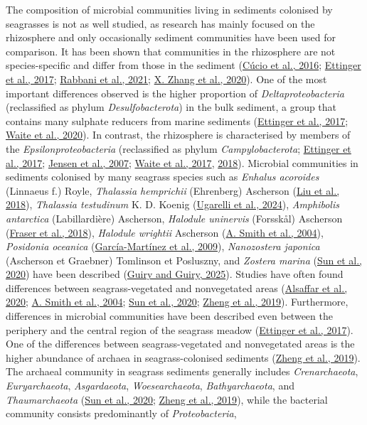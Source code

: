 \documentclass[
  12 pt,
]{book}
\begin{document}
The composition of microbial communities living in sediments colonised by seagrasses is not as well studied, as research has mainly focused on the rhizosphere and only occasionally sediment communities have been used for comparison. It has been shown that communities in the rhizosphere are not species-specific and differ from those in the sediment (\protect\hyperlink{ref-Cucio2016}{Cúcio et al., 2016}; \protect\hyperlink{ref-Ettinger2017}{Ettinger et al., 2017}; \protect\hyperlink{ref-Rabbani2021}{Rabbani et al., 2021}; \protect\hyperlink{ref-Zhang2020}{X. Zhang et al., 2020}). One of the most important differences observed is the higher proportion of \emph{Deltaproteobacteria} (reclassified as phylum \emph{Desulfobacterota}) in the bulk sediment, a group that contains many sulphate reducers from marine sediments (\protect\hyperlink{ref-Ettinger2017}{Ettinger et al., 2017}; \protect\hyperlink{ref-Waite2020}{Waite et al., 2020}). In contrast, the rhizosphere is characterised by members of the \emph{Epsilonproteobacteria} (reclassified as phylum \emph{Campylobacterota}; \protect\hyperlink{ref-Ettinger2017}{Ettinger et al., 2017}; \protect\hyperlink{ref-Jensen2007}{Jensen et al., 2007}; \protect\hyperlink{ref-Waite2017}{Waite et al., 2017}, \protect\hyperlink{ref-Waite2018}{2018}). Microbial communities in sediments colonised by many seagrass species such as \emph{Enhalus acoroides} (Linnaeus f.) Royle, \emph{Thalassia hemprichii} (Ehrenberg) Ascherson (\protect\hyperlink{ref-Liu2018}{Liu et al., 2018}), \emph{Thalassia testudinum} K. D. Koenig (\protect\hyperlink{ref-Ugarelli2024}{Ugarelli et al., 2024}), \emph{Amphibolis antarctica} (Labillardière) Ascherson, \emph{Halodule uninervis} (Forsskål) Ascherson (\protect\hyperlink{ref-Fraser2018}{Fraser et al., 2018}), \emph{Halodule wrightii} Ascherson (\protect\hyperlink{ref-Smith2004}{A. Smith et al., 2004}), \emph{Posidonia oceanica} (\protect\hyperlink{ref-Garcia-Martinez2009}{García-Martínez et al., 2009}), \emph{Nanozostera japonica} (Ascherson et Graebner) Tomlinson et Posluszny, and \emph{Zostera marina} (\protect\hyperlink{ref-Sun2020}{Sun et al., 2020}) have been described (\protect\hyperlink{ref-Guiry2025}{Guiry and Guiry, 2025}). Studies have often found differences between seagrass-vegetated and nonvegetated areas (\protect\hyperlink{ref-Alsaffar2020}{Alsaffar et al., 2020}; \protect\hyperlink{ref-Smith2004}{A. Smith et al., 2004}; \protect\hyperlink{ref-Sun2020}{Sun et al., 2020}; \protect\hyperlink{ref-Zheng2019}{Zheng et al., 2019}). Furthermore, differences in microbial communities have been described even between the periphery and the central region of the seagrass meadow (\protect\hyperlink{ref-Ettinger2017}{Ettinger et al., 2017}). One of the differences between seagrass-vegetated and nonvegetated areas is the higher abundance of archaea in seagrass-colonised sediments (\protect\hyperlink{ref-Zheng2019}{Zheng et al., 2019}). The archaeal community in seagrass sediments generally includes \emph{Crenarchaeota}, \emph{Euryarchaeota}, \emph{Asgardaeota}, \emph{Woesearchaeota}, \emph{Bathyarchaeota}, and \emph{Thaumarchaeota} (\protect\hyperlink{ref-Sun2020}{Sun et al., 2020}; \protect\hyperlink{ref-Zheng2019}{Zheng et al., 2019}), while the bacterial community consists predominantly of \emph{Proteobacteria}, 
\end{document}
